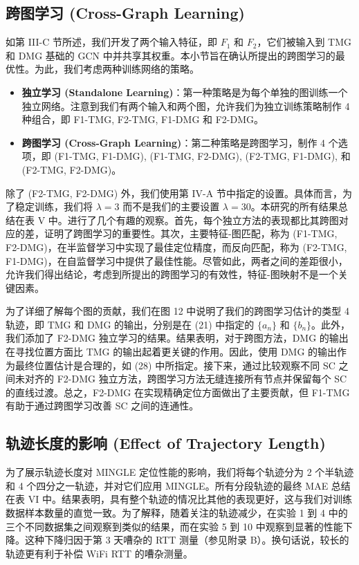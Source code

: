 \documentclass[journal]{IEEEtran}
\begin{document}
\subsection{跨图学习 (Cross-Graph Learning)}
如第 III-C 节所述，我们开发了两个输入特征，即 $F_1$ 和 $F_2$，它们被输入到 TMG 和 DMG 基础的 GCN 中并共享其权重。本小节旨在确认所提出的跨图学习的最优性。为此，我们考虑两种训练网络的策略。
\begin{itemize}
    \item \textbf{独立学习 (Standalone Learning)}：第一种策略是为每个单独的图训练一个独立网络。注意到我们有两个输入和两个图，允许我们为独立训练策略制作 4 种组合，即 F1-TMG, F2-TMG, F1-DMG 和 F2-DMG。
    \item \textbf{跨图学习 (Cross-Graph Learning)}：第二种策略是跨图学习，制作 4 个选项，即 (F1-TMG, F1-DMG), (F1-TMG, F2-DMG), (F2-TMG, F1-DMG), 和 (F2-TMG, F2-DMG)。
\end{itemize}

除了 (F2-TMG, F2-DMG) 外，我们使用第 IV-A 节中指定的设置。具体而言，为了稳定训练，我们将 $\lambda=3$ 而不是我们的主要设置 $\lambda=30$。本研究的所有结果总结在表 V 中。进行了几个有趣的观察。首先，每个独立方法的表现都比其跨图对应的差，证明了跨图学习的重要性。其次，主要特征-图匹配，称为 (F1-TMG, F2-DMG)，在半监督学习中实现了最佳定位精度，而反向匹配，称为 (F2-TMG, F1-DMG)，在自监督学习中提供了最佳性能。尽管如此，两者之间的差距很小，允许我们得出结论，考虑到所提出的跨图学习的有效性，特征-图映射不是一个关键因素。

为了详细了解每个图的贡献，我们在图 12 中说明了我们的跨图学习估计的类型 4 轨迹，即 TMG 和 DMG 的输出，分别是在 (21) 中指定的 $\{a_{n}\}$ 和 $\{b_{n}\}$。此外，我们添加了 F2-DMG 独立学习的结果。结果表明，对于跨图方法，DMG 的输出在寻找位置方面比 TMG 的输出起着更关键的作用。因此，使用 DMG 的输出作为最终位置估计是合理的，如 (28) 中所指定。接下来，通过比较观察不同 SC 之间未对齐的 F2-DMG 独立方法，跨图学习方法无缝连接所有节点并保留每个 SC 的直线过渡。总之，F2-DMG 在实现精确定位方面做出了主要贡献，但 F1-TMG 有助于通过跨图学习改善 SC 之间的连通性。

\subsection{轨迹长度的影响 (Effect of Trajectory Length)}
为了展示轨迹长度对 MINGLE 定位性能的影响，我们将每个轨迹分为 2 个半轨迹和 4 个四分之一轨迹，并对它们应用 MINGLE。所有分段轨迹的最终 MAE 总结在表 VI 中。结果表明，具有整个轨迹的情况比其他的表现更好，这与我们对训练数据样本数量的直觉一致。为了解释，随着关注的轨迹减少，在实验 1 到 4 中的三个不同数据集之间观察到类似的结果，而在实验 5 到 10 中观察到显著的性能下降。这种下降归因于第 3 天嘈杂的 RTT 测量（参见附录 B）。换句话说，较长的轨迹更有利于补偿 WiFi RTT 的嘈杂测量。
\end{document}
